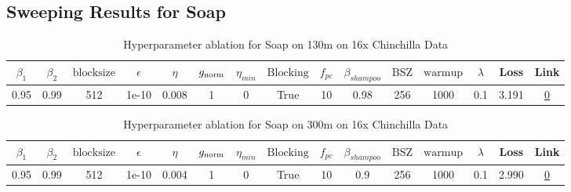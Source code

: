 \subsection{Sweeping Results for Soap}%
\begin{table}[H]
\centering
\caption{Hyperparameter ablation for Soap on 130m on 16x Chinchilla Data}
\label{tab:ablation_soap_130m_on_16x_chinchilla_data}
\begin{tabular}{ccccccccccccccc}
\toprule
$\beta_1$ & $\beta_2$ & $\mathrm{block size}$ & $\epsilon$ & $\eta$ & $g_{\mathrm{norm}}$ & $\eta_{min}$ & $\mathrm{Blocking}$ & $f_{pc}$ & $\beta_{shampoo}$ & $\mathrm{BSZ}$ & $\mathrm{warmup}$ & $\lambda$ & Loss & Link \\
\midrule
0.95 & 0.99 & 512 & 1e-10 & 0.008 & 1 & 0 & True & 10 & 0.98 & 256 & 1000 & 0.1 & 3.191 & \href{https://wandb.ai/marin-community/optimizer-scaling/runs/sweep-130m-42B-soape1786aelr0.008-wd0.1-minlr0-warmup1000-b10.95-c390d2}{0} \\
\midrule
\bottomrule
\end{tabular}
\end{table}

\begin{table}[H]
\centering
\caption{Hyperparameter ablation for Soap on 300m on 16x Chinchilla Data}
\label{tab:ablation_soap_300m_on_16x_chinchilla_data}
\begin{tabular}{ccccccccccccccc}
\toprule
$\beta_1$ & $\beta_2$ & $\mathrm{block size}$ & $\epsilon$ & $\eta$ & $g_{\mathrm{norm}}$ & $\eta_{min}$ & $\mathrm{Blocking}$ & $f_{pc}$ & $\beta_{shampoo}$ & $\mathrm{BSZ}$ & $\mathrm{warmup}$ & $\lambda$ & Loss & Link \\
\midrule
0.95 & 0.99 & 512 & 1e-10 & 0.004 & 1 & 0 & True & 10 & 0.9 & 256 & 1000 & 0.1 & 2.990 & \href{https://wandb.ai/marin-community/optimizer-scaling/runs/sweep-300m-96B-soapef479bb0lr0.004-wd0.1-minlr0-warmup1000-b10.9-ef8190}{0} \\
\midrule
\bottomrule
\end{tabular}
\end{table}

